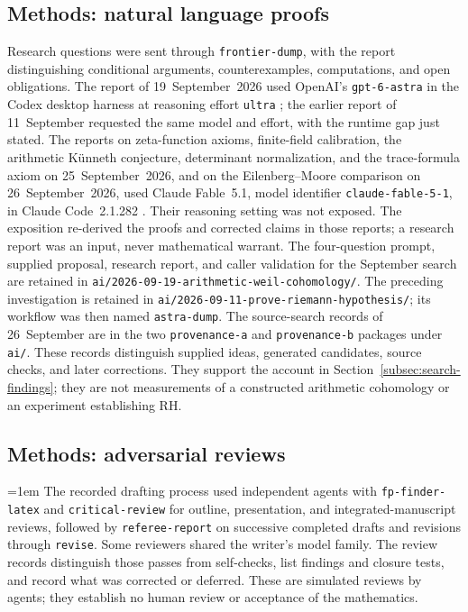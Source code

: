 \documentclass[11pt]{amsart}
\theoremstyle{plain}
\theoremstyle{definition}
\theoremstyle{remark}
\numberwithin{equation}{section}
\begin{document}
\subsection{Methods: natural language proofs}
Research questions were sent through \nolinkurl{frontier-dump}, with the
report distinguishing conditional arguments, counterexamples,
computations, and open obligations. The report of 19~September~2026 used
OpenAI's \nolinkurl{gpt-6-astra} in the Codex desktop harness at reasoning
effort \nolinkurl{ultra}
\cite[\href{https://openai.com/codex/}{product description}]{OpenAICodex,OpenAIGPT6Astra};
the earlier report of 11~September requested the same model and effort,
with the runtime gap just stated. The reports on zeta-function axioms,
finite-field calibration, the arithmetic K\"unneth conjecture,
determinant normalization, and the trace-formula axiom on
25~September~2026, and on the Eilenberg--Moore comparison on
26~September~2026, used Claude Fable~5.1, model identifier
\nolinkurl{claude-fable-5-1}, in Claude Code~2.1.282
\cite[\href{https://claude.com/product/claude-code}{product description}]%
{AnthropicClaudeCode,AnthropicClaudeFable}. Their reasoning setting was not exposed.
The exposition re-derived the proofs and corrected claims in those
reports; a research report was an input, never mathematical warrant.
The four-question prompt, supplied proposal, research report, and caller
validation for the September search are retained in
\nolinkurl{ai/2026-09-19-arithmetic-weil-cohomology/}.
The preceding investigation is retained in
\nolinkurl{ai/2026-09-11-prove-riemann-hypothesis/}; its workflow was then
named \nolinkurl{astra-dump}. The source-search records of
26~September are in the two \nolinkurl{provenance-a} and
\nolinkurl{provenance-b} packages under \nolinkurl{ai/}.
These records distinguish supplied ideas, generated candidates,
source checks, and later corrections. They support the account in
Section~\ref{subsec:search-findings}; they are not measurements of a
constructed arithmetic cohomology or an experiment establishing RH.


\subsection{Methods: adversarial reviews}
\begingroup\emergencystretch=1em
The recorded drafting process used independent agents with
\nolinkurl{fp-finder-latex} and \nolinkurl{critical-review} for outline,
presentation, and integrated-manuscript reviews, followed by
\nolinkurl{referee-report} on successive completed drafts and revisions
through \nolinkurl{revise}. Some reviewers shared the writer's model family.
The review records distinguish those passes from self-checks, list
findings and closure tests, and record what was corrected or deferred.
These are simulated reviews by agents; they establish no human review or
acceptance of the mathematics.
\par\endgroup
\end{document}
